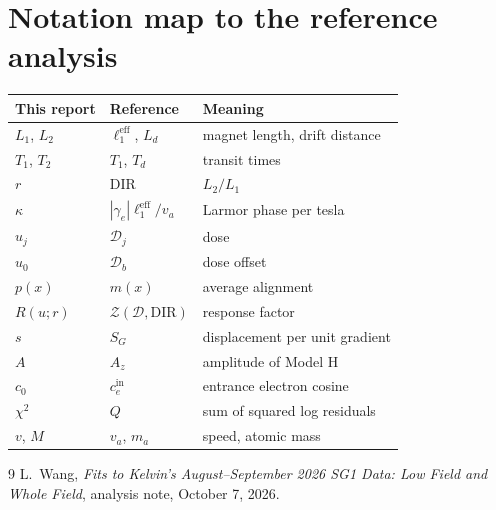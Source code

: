 \documentclass[11pt,a4paper]{article}
\begin{document}
\section{Notation map to the reference analysis}
\label{app:notation}
\begin{center}
\begin{tabular}{lll}
\toprule
This report & Reference~\cite{wang2026} & Meaning\\
\midrule
$L_1$, $L_2$            & $\ell_1^\text{eff}$, $L_d$ & magnet length, drift distance\\
$T_1$, $T_2$            & $T_1$, $T_d$ & transit times\\
$r$                     & DIR & $L_2/L_1$\\
$\kappa$                & $|\gamma_e|\ell_1^\text{eff}/v_a$ & Larmor phase per tesla\\
$u_j$                   & $\mathcal D_j$ & dose\\
$u_0$                   & $\mathcal D_b$ & dose offset\\
$p(x)$                  & $m(x)$ & average alignment\\
$R(u;r)$                & $\mathcal Z(\mathcal D,\text{DIR})$ & response factor\\
$s$                     & $S_G$ & displacement per unit gradient\\
$A$                     & $A_z$ & amplitude of Model H\\
$c_0$                   & $c_e^\text{in}$ & entrance electron cosine\\
$\chi^2$                & $Q$ & sum of squared log residuals\\
$v$, $M$                & $v_a$, $m_a$ & speed, atomic mass\\
\bottomrule
\end{tabular}
\end{center}

\begin{thebibliography}{9}
 L.~Wang, \emph{Fits to Kelvin's August--September 2026 SG1 Data: Low Field and Whole Field}, analysis note, October 7, 2026.
\end{thebibliography}
\end{document}
